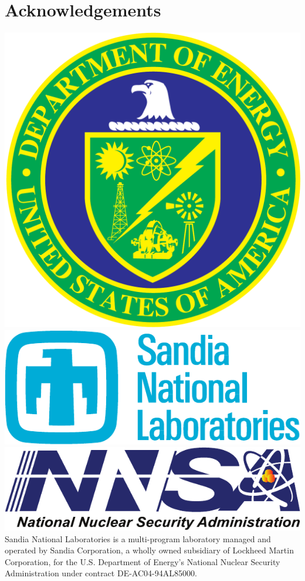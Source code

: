 \documentclass[conference]{sig-alt-gov2}
\begin{document}
\section{Acknowledgements}
\includegraphics[scale=0.07]{logos/doe_logo}
\includegraphics[scale=0.30]{logos/snl_logo}
\includegraphics[scale=0.35]{logos/nnsa_logo}
Sandia National Laboratories is a multi-program laboratory managed and operated
by Sandia Corporation, a wholly owned subsidiary of Lockheed Martin
Corporation, for the U.S. Department of Energy's National Nuclear Security
Administration under contract DE-AC04-94AL85000.
\end{document}
